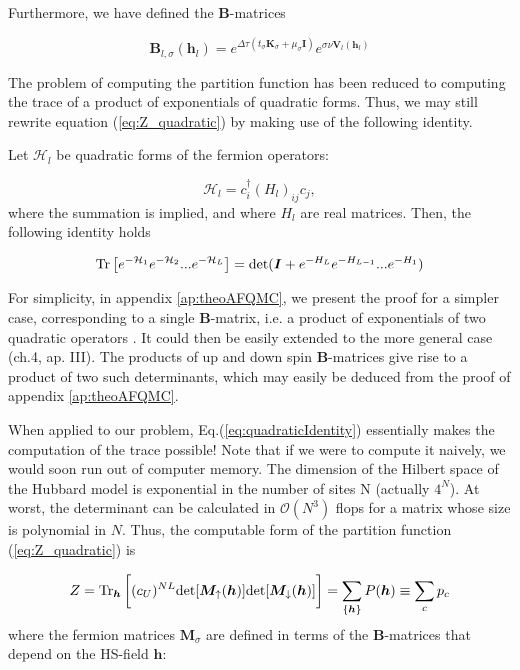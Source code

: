 Furthermore, we have defined the $\bm B$-matrices

\begin{equation}
\bm B_{l, \sigma} ( \bm h_l ) = e^{\Delta \tau ( t_\sigma \bm K_\sigma + \mu_\sigma \bm I)} e^{\sigma \nu \bm V_l (\bm h_l)}
\end{equation}

The problem of computing the partition function has been reduced to computing the trace of a product of exponentials of quadratic forms. Thus, we may still rewrite equation (\ref{eq:Z_quadratic}) by making use of the following identity.

Let $\mathcal{H}_l$ be quadratic forms of the fermion operators:

\begin{equation}
\mathcal{H}_l = c_i^\dagger (H_l)_{ij} c_j,
\end{equation}
where the summation is implied, and where $H_l$ are real matrices.
Then, the following identity holds

\begin{equation}\label{eq:quadraticIdentity}
\operatorname{Tr} \big[ e^{-\mathcal{H}_1 } e^{-\mathcal{H}_2 } ... e^{-\mathcal{H}_L } \big] = \text{det} ( \bm I + e^{-H_L} e^{-H_{L-1}} ... e^{-H_1} )
\end{equation}

For simplicity, in appendix \ref{ap:theoAFQMC}, we present the proof for a simpler case, corresponding to a single $\bm B$-matrix, i.e. a product of exponentials of two quadratic operators \cite{hirsch_two-dimensional_1985}.
It could then be easily extended to the more general case \cite{hanke_electronic_nodate}(ch.4, ap. III).
The products of up and down spin $\bm B$-matrices give rise to a product of two such determinants, which may easily be deduced from the proof of appendix \ref{ap:theoAFQMC}.

When applied to our problem, Eq.(\ref{eq:quadraticIdentity}) essentially makes the computation of the trace possible! Note that if we were to compute it naively, we would soon run out of computer memory.
The dimension of the Hilbert space of the Hubbard model is exponential in the number of sites N (actually $4^N$). At worst, the determinant can be calculated in $\mathcal{O}(N^3)$ flops for a matrix whose size is polynomial in $N$. 
Thus, the computable form of the partition function (\ref{eq:Z_quadratic}) is

\begin{equation}\label{eq:effectiveDensityMatrix}
Z =  \operatorname{Tr}_{\bm h} \bigg[ (c_U)^{NL} \text{det} [ \bm M_\uparrow (\bm h)] \text{det} [  \bm M_\downarrow (\bm h) ] \bigg] = \sum_{\{ \bm h \} } P ( \bm h ) \equiv \sum_c p_c
\end{equation}
where the fermion matrices $\bm M_\sigma$ are defined in terms of the $\bm B$-matrices that depend on the HS-field $\bm h$:

